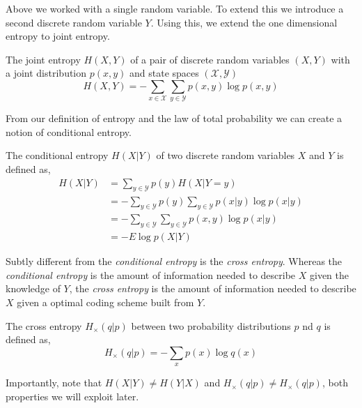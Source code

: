 Above we worked with a single random variable. To extend this we introduce a second discrete random variable $Y$. Using this, we extend the one dimensional entropy to joint entropy. 

\begin{definition}
	The joint entropy $H(X,Y)$ of a pair of discrete random variables $(X,Y)$ with a joint distribution $p(x,y)$ and state spaces $(\mathcal{X}, \mathcal{Y})$
	\begin{equation}
	H(X, Y)=-\sum_{x \in \mathcal{X}} \sum_{y \in \mathcal{Y}} p(x, y) \log p(x, y)
	\end{equation}
\end{definition}

From our definition of entropy and the law of total probability we can create a notion of conditional entropy.

\begin{definition}
	The conditional entropy $H(X|Y)$ of two discrete random variables $X$ and $Y$ is defined as, 
		\begin{align}
		H(X | Y)&=\sum_{y \in \mathcal{Y}} p(y) H(X |Y=y) \\
		&=-\sum_{y \in \mathcal{Y}} p(y) \sum_{y \in \mathcal{Y}} p(x | y) \log p(x | y) \\ 
		&=-\sum_{y \in \mathcal{Y}} \sum_{y \in \mathcal{Y}} p(x, y) \log p(x | y) \\ 
		&=-E \log p(X | Y)
		\end{align}
\end{definition}


Subtly different from the \emph{conditional entropy} is the \emph{cross entropy}. Whereas the \emph{conditional entropy} is the amount of information needed to describe $X$ given the knowledge of $Y$, the \emph{cross entropy} is the amount of information needed to describe $X$ given a optimal coding scheme built from $Y$. 

\begin{definition}
	The cross entropy $H_{\times} (q|p)$ between two probability distributions $p$ nd $q$ is defined as, 
	\begin{equation}
	H_{\times} (q|p)= - \sum_{x} p(x) \log {q(x)}
	\end{equation}
\end{definition}

\begin{remark}
	Importantly, note that $H(X|Y) \neq  H(Y|X)$ and $H_{\times} (q|p) \neq H_{\times} (q|p)$, both properties we will exploit later.
\end{remark}

